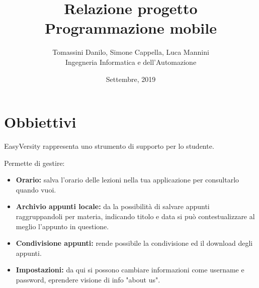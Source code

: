 \documentclass[a4paper, 50pt, twoside]{article}
\begin{document}
\title{Relazione progetto Programmazione mobile}
\date{Settembre, 2019}
\author{Tomassini Danilo, Simone Cappella, Luca Mannini \\ Ingegneria Informatica e dell'Automazione}
\maketitle
\vspace*{\fill}
\vspace*{\fill}

\newpage
\tableofcontents{}

\newpage
\section{Obbiettivi}
EasyVersity rappresenta uno strumento di supporto per lo studente.

Permette di gestire:
\begin{itemize}
\item \textbf{Orario:} salva l'orario delle lezioni nella tua applicazione per consultarlo quando vuoi.
\item \textbf{Archivio appunti locale:} da la possibilità di salvare appunti raggruppandoli per materia, indicando titolo e data si può contestualizzare al meglio l'appunto in questione.
\item \textbf{Condivisione appunti:} rende possibile la condivisione ed il download degli appunti.
\item \textbf{Impostazioni:} da qui si possono cambiare informazioni come username e password, eprendere visione di info "about us".
\end{itemize}
\end{document}
